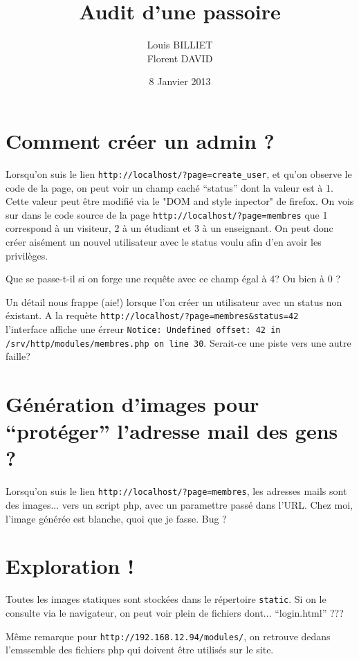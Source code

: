 \documentclass[oneside,10pt]{article}
\begin{document}
\title{Audit d'une passoire}
\author{Louis BILLIET \\ Florent DAVID}
\date{8 Janvier 2013}
\maketitle

\section{Comment cr\'eer un admin ?}
Lorsqu'on suis le lien \verb+http://localhost/?page=create_user+, et qu'on observe le code de la page, on peut voir un champ cach\'e ``status'' dont la valeur est \`a 1.
Cette valeur peut être modifi\'e via le "DOM and style inpector" de firefox. 
On vois sur dans le code source de la page \verb+http://localhost/?page=membres+ que 1 correspond \`a un visiteur, 2 \`a un \'etudiant et 3 \`a un enseignant.
On peut donc cr\'eer ais\'ement un nouvel utilisateur avec le status voulu afin d'en avoir les privil\`eges.

Que se passe-t-il si on forge une requ\^ete avec ce champ \'egal \`a 4? Ou bien \`a 0 ?

Un d\'etail nous frappe (aie!) lorsque l'on cr\'eer un utilisateur avec un status non \'existant. A la requ\`ete \verb+http://localhost/?page=membres&status=42+ 
\\l'interface affiche une \'erreur \verb+Notice: Undefined offset: 42 in /srv/http/modules/membres.php on line 30+.
Serait-ce une piste vers une autre faille? 

\section{G\'en\'eration d'images pour ``prot\'eger'' l'adresse mail des gens ?}
Lorsqu'on suis le lien \verb+http://localhost/?page=membres+, les adresses mails sont des images... vers un script php, avec un paramettre pass\'e dans l'URL.
Chez moi, l'image g\'en\'er\'ee est blanche, quoi que je fasse. Bug ?

\section{Exploration !}
Toutes les images statiques sont stock\'ees dans le r\'epertoire \verb+static+.
Si on le consulte via le navigateur, on peut voir plein de fichiers dont... ``login.html'' ???

M\^eme remarque pour \verb+http://192.168.12.94/modules/+, on retrouve dedans l'emssemble des fichiers php qui doivent \^etre utilis\'es sur le site.  
\end{document}
